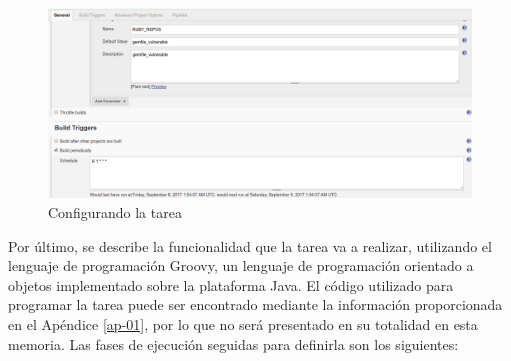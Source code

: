 \begin{figure}[htbp]
	\centering
	\includegraphics[width=1.00\linewidth]
	{desarrollo/figuras/ruby_02.png}
	\caption{Configurando la tarea}
	\label{ruby_02}
\end{figure}

Por último, se describe la funcionalidad que la tarea va a realizar, utilizando el lenguaje de programación Groovy, un lenguaje de programación orientado a objetos implementado sobre la plataforma Java. El código utilizado para programar la tarea puede ser encontrado mediante la información proporcionada en el Apéndice \ref{ap-01}, por lo que no será presentado en su totalidad en esta memoria. Las fases de ejecución seguidas para definirla son los siguientes:
\\ \\

